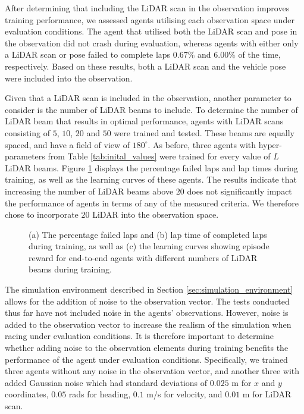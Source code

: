 After determining that including the LiDAR scan in the observation improves training performance, we assessed agents utilising each observation space under evaluation conditions.
The agent that utilised both the LiDAR scan and pose in the observation did not crash during evaluation, whereas agents with either only a LiDAR scan or pose failed to complete laps $0.67\%$ and $6.00\%$ of the time, respectively.
Based on these results, both a LiDAR scan and the vehicle pose were included into the observation.


Given that a LiDAR scan is included in the observation, another parameter to consider is the number of LiDAR beams to include.
To determine the number of LiDAR beam that results in optimal performance, agents with LiDAR scans consisting of $5$, $10$, $20$ and $50$ were trained and tested.
These beams are equally spaced, and have a field of view of $180^{\circ}$.
As before, three agents with hyper-parameters from Table \ref{tab:inital_values} were trained for every value of $L$ LiDAR beams.
Figure \ref{fig:n_beams} displays the percentage failed laps and lap times during training, as well as the learning curves of these agents.
The results indicate that increasing the number of LiDAR beams above $20$ does not significantly impact the performance of agents in terms of any of the measured criteria. 
We therefore chose to incorporate $20$ LiDAR into the observation space.

\begin{figure}[htb!]
    \centering
    
    \caption[Learning curves of agents with different numbers of LiDAR beams during training]{(a) The percentage failed laps and (b) lap time of completed laps during training, as well as (c) the learning curves showing episode reward for end-to-end agents with different numbers of LiDAR beams during training.}
    \label{fig:n_beams}
\end{figure}

The simulation environment described in Section \ref{sec:simulation_environment} allows for the addition of noise to the observation vector.
The tests conducted thus far have not included noise in the agents' observations.
However, noise is added to the observation vector to increase the realism of the simulation when racing under evaluation conditions.
It is therefore important to determine whether adding noise to the observation elements during training benefits the performance of the agent under evaluation conditions.
Specifically, we trained three agents without any noise in the observation vector, and another three with added Gaussian noise which had standard deviations of $0.025$ m for $x$ and $y$ coordinates, $0.05$ rads for heading, $0.1$ m/s for velocity, and $0.01$ m for LiDAR scan.

